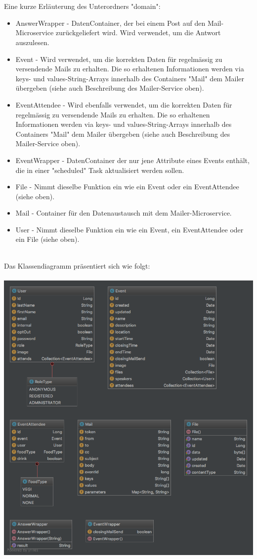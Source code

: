 \documentclass[11pt]{article} %
\begin{document}
\\
\\
Eine kurze Erläuterung des Unterordners "domain":
\begin{itemize}
\item AnswerWrapper - DatenContainer, der bei einem Post auf den Mail-Microservice zurückgeliefert wird. Wird verwendet, um die Antwort auszulesen.
\item Event - Wird verwendet, um die korrekten Daten für regelmässig zu versendende Mails zu erhalten. Die so erhaltenen Informationen werden via keys- und values-String-Arrays innerhalb des Containers "Mail" dem Mailer übergeben (siehe auch Beschreibung des Mailer-Service oben).
\item EventAttendee - Wird ebenfalls verwendet, um die korrekten Daten für regelmässig zu versendende Mails zu erhalten. Die so erhaltenen Informationen werden via keys- und values-String-Arrays innerhalb des Containers "Mail" dem Mailer übergeben (siehe auch Beschreibung des Mailer-Service oben).
\item EventWrapper - DatenContainer der nur jene Attribute eines Events enthält, die in einer "scheduled" Task aktualisiert werden sollen.
\item File - Nimmt dieselbe Funktion ein wie ein Event oder ein EventAttendee (siehe oben).
\item Mail - Container für den Datenaustausch mit dem Mailer-Microservice.
\item User - Nimmt dieselbe Funktion ein wie ein Event, ein EventAttendee oder ein File (siehe oben).
\end{itemize}
\leavevmode \\
Das Klassendiagramm präsentiert sich wie folgt:
\\
\\
\includegraphics[width=1.0\textwidth]{class-diagrams/Scheduler-domain}
\\
\\
\newpage
\end{document}
